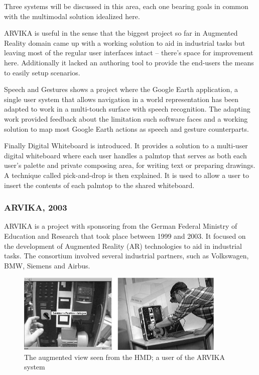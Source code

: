 

Three systems will be discussed in this area, each one bearing goals in common
with the multimodal solution idealized here.

ARVIKA is useful in the sense that the biggest project so far in Augmented Reality
domain came up with a working solution to aid in industrial tasks but leaving most
of the regular user interfaces intact -- there's space for improvement here.
Additionally it lacked an authoring tool to provide the end-users the means to
easily setup scenarios.

Speech and Gestures shows a project where the Google Earth application, a single
user system that allows navigation in a world representation has been adapted to
work in a multi-touch surface with speech recognition.
The adapting work provided feedback about the limitation such software faces 
and a working solution to map most Google Earth actions as speech and gesture counterparts.

Finally Digital Whiteboard is introduced. It provides a solution to a multi-user digital
whiteboard where each user handles a palmtop that serves as both each user's palette and
private composing area, for writing text or preparing drawings.
A technique called pick-and-drop is then explained. It is used to allow a user to insert
the contents of each palmtop to the shared whiteboard.


\subsubsection{ARVIKA, 2003}

ARVIKA \cite{ARVIKA} is a project with sponsoring from the
German Federal Ministry of Education and Research that took place between 1999 and 2003.
It focused on the development of Augmented Reality (AR) technologies to aid in industrial tasks.
The consortium involved several industrial partners, such as Volkswagen, BMW, Siemens and Airbus.

\begin{figure}[!ht]
    \centering
    \includegraphics[width=10cm]{gfx/arvika.png}
    \caption{The augmented view seen from the HMD; a user of the ARVIKA system}
    \label{FIG-ARVIKA}
\end{figure}

